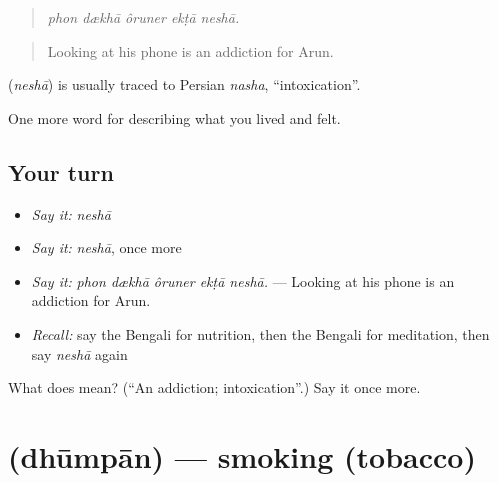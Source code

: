 \begin{quote}
    
\end{quote}

\begin{quote}
\emph{phon dækhā ôruner ekṭā neshā.}
\end{quote}

\begin{quote}
Looking at his phone is an addiction for Arun.
\end{quote}

\begin{cousinweb}
\textbf{} (\emph{neshā}) is usually traced to Persian \emph{nasha}, \textquotedblleft{}intoxication\textquotedblright{}.
\end{cousinweb}

\begin{grammarlens}[title={What you've built}]
One more word for describing what you lived and felt.
\end{grammarlens}

\subsection*{Your turn}
\begin{itemize}
\raggedright
  \item \emph{Say it:} \emph{neshā}
  \item \emph{Say it:} \emph{neshā}, once more
  \item \emph{Say it:} \emph{phon dækhā ôruner ekṭā neshā.} — Looking at his phone is an addiction for Arun.
  \item \emph{Recall:} say the Bengali for nutrition, then the Bengali for meditation, then say \emph{neshā} again
\end{itemize}

\begin{tcolorbox}[breakable,colback=teal!4,colframe=teal!35!black,title={Before you move on}]
What does  mean? (\textquotedblleft{}An addiction; intoxication\textquotedblright{}.) Say it once more.
\end{tcolorbox}
\section[\texorpdfstring{\bn{ধূমপান} (dhūmpān)}{ধূমপান (dhūmpān)}]{ (dhūmpān) — smoking (tobacco)}

\label{lesson:BN-C480-dhumpan}



